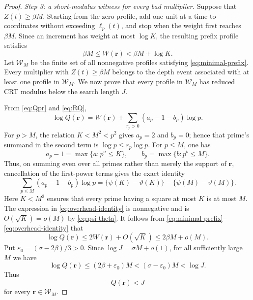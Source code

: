 \documentclass[10pt,a4paper]{amsart}
\begin{document}
\begin{proof}
\medskip
\noindent\emph{Step 3: a short-modulus witness for every bad multiplier.}
Suppose that \(Z(t)\geq\beta M\).  Starting from the zero profile, add
one unit at a time to coordinates without exceeding
\(\ell_p(t)\), and stop when the weight first reaches \(\beta M\).
Since an increment has weight at most \(\log K\), the resulting prefix
profile satisfies
\begin{equation}\label{eq:minimal-prefix}
 \beta M\leq W(\mathbf r)<\beta M+\log K.
\end{equation}
Let \(\mathcal W_M\) be the finite set of all nonnegative profiles satisfying
\eqref{eq:minimal-prefix}.  Every multiplier with \(Z(t)\geq\beta M\)
belongs to the depth event associated with at least one profile in
\(\mathcal W_M\).  We now prove that every profile in \(\mathcal W_M\) has
reduced CRT modulus below the search length \(J\).

From \eqref{eq:Qpr} and \eqref{eq:RQ},
\begin{equation}\label{eq:logQ}
 \log Q(\mathbf r)
 =W(\mathbf r)+
  \sum_{r_p>0}(a_p-1-b_p)\log p.
\end{equation}
For \(p>M\), the relation \(K<M^2<p^2\) gives
\(a_p=2\) and \(b_p=0\); hence that prime's summand in the second term
is \(\log p\leq r_p\log p\).  For \(p\leq M\), one has
\[
 a_p-1=\max\{a:p^a\leq K\},
 \qquad
 b_p=\max\{b:p^b\leq M\}.
\]
Thus, on summing even over all primes rather than merely the support of
\(\mathbf r\), cancellation of the first-power terms gives the exact identity
\begin{equation}\label{eq:overhead-identity}
 \sum_{p\leq M}(a_p-1-b_p)\log p
 =\{\psi(K)-\vartheta(K)\}
  -\{\psi(M)-\vartheta(M)\}.
\end{equation}
Here \(K<M^2\) ensures that every prime having a square at most \(K\) is
at most \(M\).  The expression in \eqref{eq:overhead-identity} is
nonnegative and is \(O(\sqrt K)=o(M)\) by
\eqref{eq:psi-theta}.  It follows from
\eqref{eq:minimal-prefix}--\eqref{eq:overhead-identity} that
\begin{equation}\label{eq:Q-before-plus-one}
 \log Q(\mathbf r)
 \leq2W(\mathbf r)+O(\sqrt K)
 \leq2\beta M+o(M).
\end{equation}
Put \(\varepsilon_0=(\sigma-2\beta)/3>0\).  Since
\(\log J=\sigma M+o(1)\), for all sufficiently large \(M\) we have
\[
 \log Q(\mathbf r)
 \leq(2\beta+\varepsilon_0)M
 <(\sigma-\varepsilon_0)M
 <\log J.
\]
Thus
\begin{equation}\label{eq:Q-less-J}
 Q(\mathbf r)<J
\end{equation}
for every \(\mathbf r\in\mathcal W_M\).


\end{proof}
\end{document}
